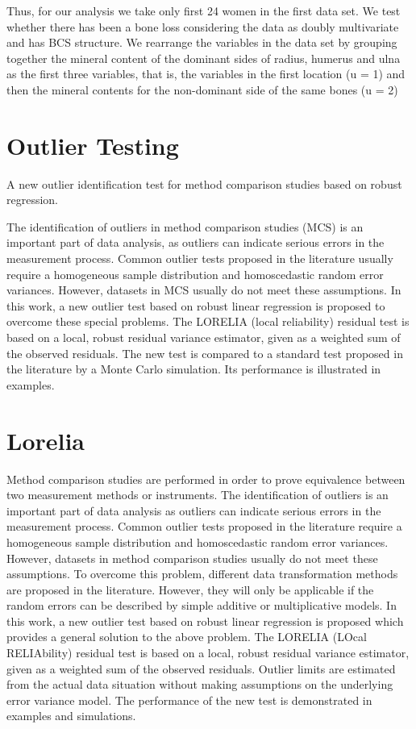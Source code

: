 \documentclass[12pt, a4paper]{report}
\theoremstyle{plain}
\theoremstyle{definition}
\theoremstyle{remark}
\begin{document}
Thus, for our analysis
we take only ﬁrst 24 women in the ﬁrst data set. We test whether there has been a bone loss
considering the data as doubly multivariate and has BCS structure. We rearrange the variables
in the data set by grouping together the mineral content of the dominant sides of radius, humerus
and ulna as the ﬁrst three variables, that is, the variables in the ﬁrst location (u = 1) and then
the mineral contents for the non-dominant side of the same bones (u = 2)



\section{Outlier Testing} 
A new outlier identification test for method comparison studies based on robust regression.

The identification of outliers in method comparison studies (MCS) is an important part of data analysis, as outliers can indicate serious errors in the measurement process. Common outlier tests proposed in the literature usually require a homogeneous sample distribution and homoscedastic random error variances. However, datasets in MCS usually do not meet these assumptions. In this work, a new outlier test based on robust linear regression is proposed to overcome these special problems. The LORELIA (local reliability) residual test is based on a local, robust residual variance estimator, given as a weighted sum of the observed residuals. The new test is compared to a standard test proposed in the literature by a Monte Carlo simulation. Its performance is illustrated in examples.

\section{Lorelia}


Method comparison studies are performed in order to prove equivalence between two measurement methods or instruments. The identification of outliers is an important part of data analysis as outliers can indicate serious errors in the measurement process. Common outlier tests 
proposed in the literature require a homogeneous sample distribution and homoscedastic random error variances. However, datasets in method comparison studies usually do not meet these assumptions. To overcome this problem, different data transformation methods are proposed in the literature. However, they will only be applicable if the random errors can be described by simple additive or multiplicative models. In this work, a new outlier test based on robust linear regression is proposed which provides a general solution to the above problem. The LORELIA (LOcal RELIAbility) residual test is based on a local, robust residual variance estimator, given as a weighted sum of the observed residuals. Outlier limits are estimated from the actual data situation without making assumptions on the underlying error variance model. The performance of the new test is demonstrated in examples and simulations.
\end{document}

